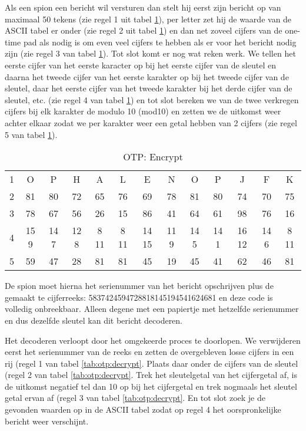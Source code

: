 Als een spion een bericht wil versturen dan stelt hij eerst zijn bericht op van maximaal 50 tekens (zie regel 1 uit tabel \ref{tab:otp:encrypt}), per letter zet hij de waarde van de ASCII tabel er onder (zie regel 2 uit tabel \ref{tab:otp:encrypt}) en dan net zoveel cijfers van de one-time pad als nodig is om even veel cijfers te hebben als er voor het bericht nodig zijn (zie regel 3 van tabel \ref{tab:otp:encrypt}). Tot slot komt er nog wat reken werk. We tellen het eerste cijfer van het eerste karacter op bij het eerste cijfer van de sleutel en daarna het tweede cijfer van het eerste karakter op bij het tweede cijfer van de sleutel, daar het eerste cijfer van het tweede karakter bij het derde cijfer van de sleutel, etc. (zie regel 4 van tabel \ref{tab:otp:encrypt}) en tot slot bereken we van de twee verkregen cijfers bij elk karakter de modulo 10 (mod10) en zetten we de uitkomst weer achter elkaar zodat we per karakter weer een getal hebben van 2 cijfers (zie regel 5 van tabel \ref{tab:otp:encrypt}).

\begin{table}[h!]
\setlength\tabcolsep{1.5pt}
\centering
\begin{tabular}{ | c || c | c | c | c | c | c | c | c | c | c | c | c | }
\hline
	1 & O    & P    & H    & A    & L     & E    & N    & O    & P    & J    & F    & K  \\
	2 & 81   & 80   & 72   & 65   & 76    & 69   & 78   & 81   & 80   & 74   & 70   & 75 \\
	3 & 78   & 67   & 56   & 26   & 15    & 86   & 41   & 64   & 61   & 98   & 76   & 16 \\
	4 & 15 9 & 14 7 & 12 8 & 8 11 & 8 11  & 14 15& 11 9 & 14 5 & 14 1 & 16 12& 14 6 & 8 11 \\
	5 & 59   & 47   & 28   & 81   & 81    & 45   & 19   & 45   & 41   & 62   & 46   & 81 \\
\hline
\end{tabular}
\caption{OTP: Encrypt}
\label{tab:otp:encrypt}
\end{table}

De spion moet hierna het serienummer van het bericht opschrijven plus de gemaakt te cijferreeks: 5837424594728818145194541624681 en deze code is volledig onbreekbaar. Alleen degene met een papiertje met hetzelfde serienummer en dus dezelfde sleutel kan dit bericht decoderen.

Het decoderen verloopt door het omgekeerde proces te doorlopen. We verwijderen eerst het serienummer van de reeks en zetten de overgebleven losse cijfers in een rij (regel 1 van tabel \ref{tab:otp:decrypt}. Plaats daar onder de cijfers van de sleutel (regel 2 van tabel \ref{tab:otp:decrypt}. Trek het sleutelgetal van het cijfergetal af, is de uitkomst negatief tel dan 10 op bij het cijfergetal en trek nogmaals het sleutel getal ervan af (regel 3 van tabel \ref{tab:otp:decrypt}. En tot slot zoek je de gevonden waarden op in de ASCII tabel zodat op regel 4 het oorspronkelijke bericht weer verschijnt.

